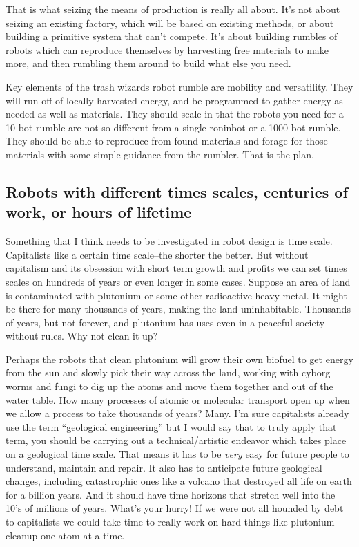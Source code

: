 That is what seizing the means of production is really all about. It's
not about seizing an existing factory, which will be based on existing
methods, or about building a primitive system that can't compete. It's
about building rumbles of robots which can reproduce themselves by
harvesting free materials to make more, and then rumbling them around to
build what else you need.

Key elements of the trash wizards robot rumble are mobility and
versatility. They will run off of locally harvested energy, and be
programmed to gather energy as needed as well as materials. They should
scale in that the robots you need for a 10 bot rumble are not so
different from a single roninbot or a 1000 bot rumble. They should be
able to reproduce from found materials and forage for those materials
with some simple guidance from the rumbler. That is the plan.

\subsection{Robots with different times scales, centuries of work, or
hours of
lifetime}\label{robots-with-different-times-scales-centuries-of-work-or-hours-of-lifetime}

Something that I think needs to be investigated in robot design is time
scale. Capitalists like a certain time scale--the shorter the better.
But without capitalism and its obsession with short term growth and
profits we can set times scales on hundreds of years or even longer in
some cases. Suppose an area of land is contaminated with plutonium or
some other radioactive heavy metal. It might be there for many thousands
of years, making the land uninhabitable. Thousands of years, but not
forever, and plutonium has uses even in a peaceful society without
rules. Why not clean it up?

Perhaps the robots that clean plutonium will grow their own biofuel to
get energy from the sun and slowly pick their way across the land,
working with cyborg worms and fungi to dig up the atoms and move them
together and out of the water table. How many processes of atomic or
molecular transport open up when we allow a process to take thousands of
years? Many. I'm sure capitalists already use the term ``geological
engineering'' but I would say that to truly apply that term, you should
be carrying out a technical/artistic endeavor which takes place on a
geological time scale. That means it has to be \emph{very} easy for
future people to understand, maintain and repair. It also has to
anticipate future geological changes, including catastrophic ones like a
volcano that destroyed all life on earth for a billion years. And it
should have time horizons that stretch well into the 10's of millions of
years. What's your hurry! If we were not all hounded by debt to
capitalists we could take time to really work on hard things like
plutonium cleanup one atom at a time.

